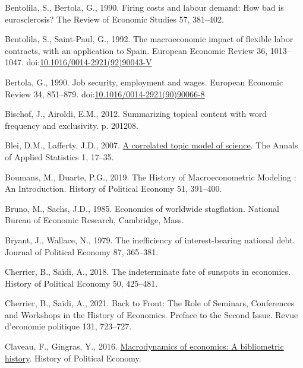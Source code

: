 \documentclass[
]{article}
\newlength{\cslhangindent}
\newlength{\cslentryspacingunit} %
\newenvironment{CSLReferences}[2] %
 {%
  \setlength{\parindent}{0pt}
  \ifodd #1
  \let\oldpar\par
  \def\par{\hangindent=\cslhangindent\oldpar}
  \fi
  \setlength{\parskip}{#2\cslentryspacingunit}
 }%
 {}
\begin{document}
\begin{CSLReferences}{1}{0}
\leavevmode{}%
Bentolila, S., Bertola, G., 1990. Firing costs and labour demand: How
bad is eurosclerosis? The Review of Economic Studies 57, 381--402.

\leavevmode{}%
Bentolila, S., Saint-Paul, G., 1992. The macroeconomic impact of
flexible labor contracts, with an application to {Spain}. European
Economic Review 36, 1013--1047.
doi:\href{https://doi.org/10.1016/0014-2921(92)90043-V}{10.1016/0014-2921(92)90043-V}

\leavevmode{}%
Bertola, G., 1990. Job security, employment and wages. European Economic
Review 34, 851--879.
doi:\href{https://doi.org/10.1016/0014-2921(90)90066-8}{10.1016/0014-2921(90)90066-8}

\leavevmode{}%
Bischof, J., Airoldi, E.M., 2012. Summarizing topical content with word
frequency and exclusivity. p. 201208.

\leavevmode{}%
Blei, D.M., Lafferty, J.D., 2007.
\href{https://www.jstor.org/stable/4537420}{A correlated topic model of
science}. The Annals of Applied Statistics 1, 17--35.

\leavevmode{}%
Boumans, M., Duarte, P.G., 2019. The {History} of {Macroeconometric
Modeling} : {An Introduction}. History of Political Economy 51,
391--400.

\leavevmode{}%
Bruno, M., Sachs, J.D., 1985. Economics of worldwide stagflation.
{National Bureau of Economic Research}, {Cambridge, Mass.}

\leavevmode{}%
Bryant, J., Wallace, N., 1979. The inefficiency of interest-bearing
national debt. Journal of Political Economy 87, 365--381.

\leavevmode{}%
Cherrier, B., Saïdi, A., 2018. The indeterminate fate of sunspots in
economics. History of Political Economy 50, 425--481.

\leavevmode{}%
Cherrier, B., Saïdi, A., 2021. Back to {Front}: {The Role} of
{Seminars}, {Conferences} and {Workshops} in the {History} of
{Economics}. {Preface} to the {Second Issue}. Revue d'economie politique
131, 723--727.

\leavevmode{}%
Claveau, F., Gingras, Y., 2016.
\href{http://hope.dukejournals.org/cgi/content/short/48/4/551?rss=1}{Macrodynamics
of economics: A bibliometric history}. History of Political Economy.


\end{CSLReferences}
\end{document}
